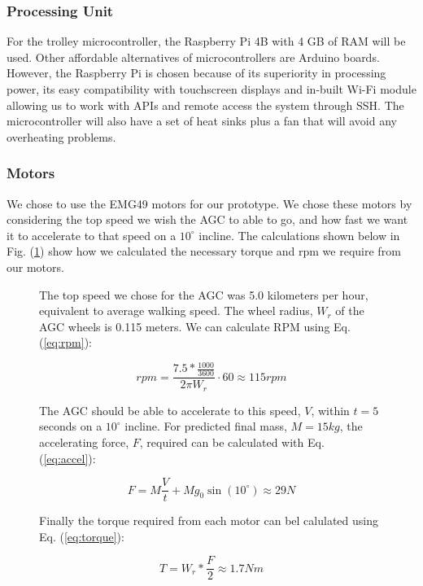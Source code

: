\documentclass[11pt,landscape]{article}
\begin{document}
\begin{multicols}{3}
\subsubsection{Processing Unit}
For the trolley microcontroller, the Raspberry Pi 4B with 4 GB of RAM will be
used. Other affordable alternatives of microcontrollers are Arduino boards.
However, the Raspberry Pi is chosen because of its superiority in processing
power, its easy compatibility with touchscreen displays and in-built Wi-Fi
module allowing us to work with APIs and remote access the system through SSH. The
microcontroller will also have a set of heat sinks plus a fan that will avoid
any overheating problems.


\subsubsection{Motors}
We chose to use the EMG49 motors for our prototype. We chose these motors by
considering the top speed we wish the AGC to able to go, and how fast we want it
to accelerate to that speed on a $10^\circ$ incline. The calculations shown
below in Fig. (\ref{fig:motor_calcs}) show how we calculated the necessary
torque and rpm we require from our motors.

\begin{figure}[H]
    \begin{mdframed}
        The top speed we chose for the AGC was 5.0 kilometers per hour,
        equivalent to average walking speed. The wheel radius, $W_r$ of the AGC
        wheels is 0.115 meters. We can calculate RPM using Eq. (\ref{eq:rpm}):
        \begin{center}
            \begin{equation}
                rpm = \frac{7.5 * \frac{1000}{3600}}{2\pi W_r} \cdot 60 \approx 115rpm
                \label{eq:rpm}
            \end{equation}
        \end{center}
        The AGC should be able to accelerate to this speed, $V$, within $t=5$
        seconds on a $10^\circ$ incline. For predicted final mass, $M = 15kg$,
        the accelerating force, $F$, required can be calculated with Eq.
        (\ref{eq:accel}):
        \begin{center}
            \begin{equation}
                F = M\frac{V}{t} + M g_0 \sin(10^\circ)\approx 29 N
                \label{eq:accel}
            \end{equation}
        \end{center}
        Finally the torque required from each motor can bel calulated using Eq.
        (\ref{eq:torque}):
        \begin{center}
            \begin{equation}
                T = W_r * \frac{F}{2} \approx 1.7 Nm
                \label{eq:torque} 
            \end{equation}
        \end{center}
    \end{mdframed}
    \label{fig:motor_calcs}
\end{figure}


\end{multicols}
\end{document}

